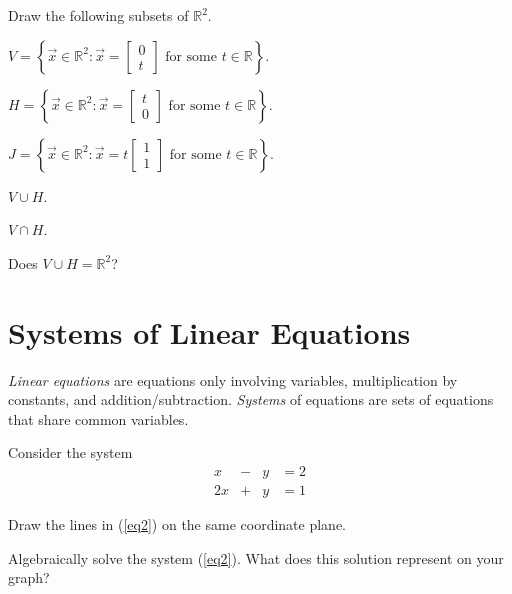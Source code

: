 \documentclass[14pt]{problemset}
\newcommand{\R}{\mathbb{R}}
\begin{document}
	\question
	Draw the following subsets of $\R^2$.
	\begin{parts}
		\item $V=\left\{\vec x\in\R^2:\vec x=\begin{bmatrix}0\\t\end{bmatrix}\text{ for some }t\in\R\right\}$.
		\item $H=\left\{\vec x\in\R^2:\vec x=\begin{bmatrix}t\\0\end{bmatrix}\text{ for some }t\in\R\right\}$.
		\item $J=\left\{\vec x\in\R^2:\vec x=t\begin{bmatrix}1\\1\end{bmatrix}\text{ for some }t\in\R\right\}$.
		\item $V\cup H$.
		\item $V\cap H$.
		\item Does $V\cup H=\R^2$?
	\end{parts}



\section*{Systems of Linear Equations}
	
	\emph{Linear equations} are equations only involving variables, 
	multiplication by constants, and addition/subtraction.  \emph{Systems}
	of equations are sets of equations that share common variables.

	\question
	Consider the system
	\begin{equation}\label{eq2}
		\begin{array}{rcrl}
			x &-&y &= 2\\
			2x &+&y &= 1
		\end{array}
	\end{equation}

	\begin{parts}
		\item Draw the lines in (\ref{eq2}) on the same coordinate plane.
		\item Algebraically solve the system (\ref{eq2}).  What does this 
		solution represent on your graph?
	\end{parts}
	
\end{document}
